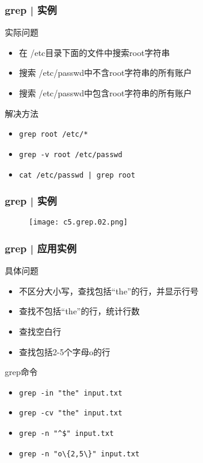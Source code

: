 \begin{frame}[fragile]
  \frametitle{grep | \alert{实例}}
  \begin{block}{实际问题}
    \begin{itemize}
      \item<2-> 在 /etc目录下面的文件中搜索root字符串
      \item<4-> 搜索 /etc/passwd中不含root字符串的所有账户
      \item<6-> 搜索 /etc/passwd中包含root字符串的所有账户
    \end{itemize}
  \end{block}
  \begin{block}{解决方法}
    \begin{itemize}
      \item<3-> \verb|grep root /etc/*|
      \item<5-> \verb|grep -v root /etc/passwd|
      \item<7-> \verb=cat /etc/passwd | grep root=
    \end{itemize}
  \end{block}
\end{frame}

\begin{frame}
  \frametitle{grep | 实例}
  \begin{figure}
    \centering
    \texttt{[image: c5.grep.02.png]}
  \end{figure}
\end{frame}

\begin{frame}[fragile]
  \frametitle{grep | \alert{应用实例}}
  \begin{block}{具体问题}
    \begin{itemize}
      \item<2-> 不区分大小写，查找包括“the”的行，并显示行号
      \item<4-> 查找不包括“the”的行，统计行数
      \item<6-> 查找空白行
      \item<8-> 查找包括2-5个字母o的行
    \end{itemize}
  \end{block}
  \begin{block}{grep命令}
    \begin{itemize}
      \item<3-> \verb|grep -in "the" input.txt|
      \item<5-> \verb|grep -cv "the" input.txt|
      \item<7-> \verb|grep -n "^$" input.txt|
      \item<9-> \verb|grep -n "o\{2,5\}" input.txt|
    \end{itemize}
  \end{block}
\end{frame}


